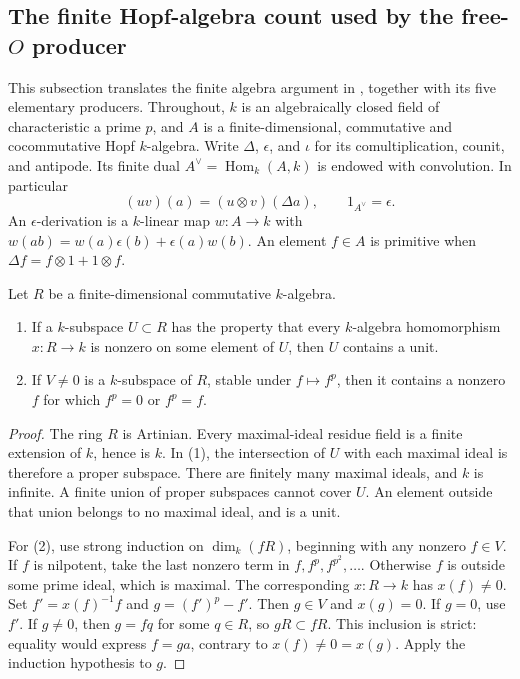 \subsection{The finite Hopf-algebra count used by the free-\(O\) producer}
\label{subsec:faithful-hopf-count}

This subsection translates the finite algebra argument in
, together with its five elementary
producers.  Throughout, \(k\) is an algebraically closed field of
characteristic a prime \(p\), and \(A\) is a finite-dimensional,
commutative and cocommutative Hopf \(k\)-algebra.  Write \(\Delta\),
\(\epsilon\), and \(\iota\) for its comultiplication, counit, and
antipode.  Its finite dual \(A^\vee=\operatorname{Hom}_k(A,k)\) is
endowed with convolution.  In particular
\[
 (uv)(a)=(u\otimes v)(\Delta a),\qquad
 1_{A^\vee}=\epsilon .
\]
An \(\epsilon\)-derivation is a \(k\)-linear map \(w:A\to k\) with
\(w(ab)=w(a)\epsilon(b)+\epsilon(a)w(b)\).  An element \(f\in A\) is
primitive when \(\Delta f=f\otimes1+1\otimes f\).

\begin{srlemma}\label{lem:faithful-hopf-choices}
Let \(R\) be a finite-dimensional commutative \(k\)-algebra.
\begin{enumerate}
\item If a \(k\)-subspace \(U\subset R\) has the property that every
\(k\)-algebra homomorphism \(x:R\to k\) is nonzero on some element of
\(U\), then \(U\) contains a unit.
\item If \(V\ne0\) is a \(k\)-subspace of \(R\), stable under
\(f\mapsto f^p\), then it contains a nonzero \(f\) for which
\(f^p=0\) or \(f^p=f\).
\end{enumerate}
\end{srlemma}
\begin{proof}
The ring \(R\) is Artinian.  Every maximal-ideal residue field is a
finite extension of \(k\), hence is \(k\).  In (1), the intersection
of \(U\) with each maximal ideal is therefore a proper subspace.
There are finitely many maximal ideals, and \(k\) is infinite.
A finite union of proper subspaces cannot cover \(U\).  An element
outside that union belongs to no maximal ideal, and is a unit.

For (2), use strong induction on \(\dim_k(fR)\), beginning with any
nonzero \(f\in V\).  If \(f\) is nilpotent, take the last nonzero term
in \(f,f^p,f^{p^2},\ldots\).  Otherwise \(f\) is outside some prime
ideal, which is maximal.  The corresponding \(x:R\to k\) has
\(x(f)\ne0\).  Set \(f'=x(f)^{-1}f\) and \(g=(f')^p-f'\).
Then \(g\in V\) and \(x(g)=0\).  If \(g=0\), use \(f'\).
If \(g\ne0\), then \(g=fq\) for some \(q\in R\), so \(gR\subset fR\).
This inclusion is strict: equality would express \(f=ga\), contrary
to \(x(f)\ne0=x(g)\).  Apply the induction hypothesis to \(g\).
\end{proof}

